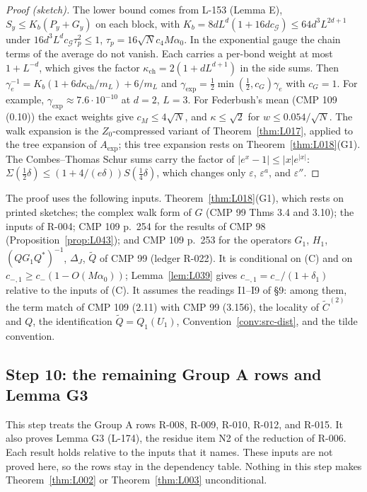 \begin{proof}[Proof (sketch)]
The lower bound comes from L-153 (Lemma E), $S_y\le K_b(P_y+G_y)$ on each block, with $K_b=8dL^d(1+16dc_{\mathcal G})\le64d^3L^{2d+1}$ under $16d^3L^dc_{\mathcal G}\tau_p^2\le1$, $\tau_p=16\sqrt N c_4M\alpha_0$. In the exponential gauge the chain terms of the average do not vanish. Each carries a per-bond weight at most $1+L^{-d}$, which gives the factor $\kappa_{\mathrm{ch}}=2(1+dL^{d+1})$ in the side sums. Then $\gamma_e^{-1}=K_b(1+6d\kappa_{\mathrm{ch}}/m_L)+6/m_L$ and $\gamma_{\exp}=\tfrac12\min(\tfrac12,c_G)\gamma_e$ with $c_G=1$. For example, $\gamma_{\exp}\approx7.6\cdot10^{-10}$ at $d=2$, $L=3$. For Federbush's mean (CMP 109 (0.10)) the exact weights give $c_M\le4\sqrt N$, and $\kappa\le\sqrt2$ for $w\le0.054/\sqrt N$. The walk expansion is the $Z_0$-compressed variant of Theorem~\ref{thm:L017}, applied to the tree expansion of $A_{\exp}$; this tree expansion rests on Theorem~\ref{thm:L018}(G1). The Combes--Thomas Schur sums carry the factor of $|e^x-1|\le|x|e^{|x|}$: $\Sigma(\tfrac12\delta)\le(1+4/(e\delta))S(\tfrac14\delta)$, which changes only $\varepsilon$, $\varepsilon^a$, and $\varepsilon''$.
\end{proof}
The proof uses the following inputs. Theorem~\ref{thm:L018}(G1), which rests on printed sketches; the complex walk form of $G$ (CMP 99 Thms 3.4 and 3.10); the inputs of R-004; CMP 109 p.~254 for the results of CMP 98 (Proposition~\ref{prop:L043}); and CMP 109 p.~253 for the operators $G_1$, $H_1$, $(QG_1Q^*)^{-1}$, $\Delta_J$, $\tilde Q$ of CMP 99 (ledger R-022). It is conditional on (C) and on $c_{-,1}\ge c_-(1-O(M\alpha_0))$; Lemma~\ref{lem:L039} gives $c_{-,1}=c_-/(1+\delta_1)$ relative to the inputs of (C). It assumes the readings I1--I9 of  \S9: among them, the term match of CMP 109 (2.11) with CMP 99 (3.156), the locality of $\tilde C^{(2)}$ and $Q$, the identification $\tilde Q=Q_1(U_1)$, Convention~\ref{conv:src-dist}, and the tilde convention.
\subsection{Step 10: the remaining Group A rows and Lemma G3}\label{sec:src-r5}

This step treats the Group A rows R-008, R-009, R-010, R-012, and R-015. It also proves Lemma G3 (L-174), the residue item N2 of the reduction of R-006. Each result holds relative to the inputs that it names. These inputs are not proved here, so the rows stay in the dependency table. Nothing in this step makes Theorem~\ref{thm:L002} or Theorem~\ref{thm:L003} unconditional.

